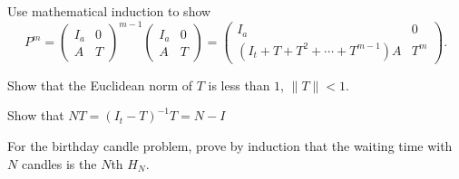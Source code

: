 \documentclass[12pt]{article}
\begin{document}
\begin{exercise}
  Use mathematical induction to show
\[
    P^{m} =
    \begin{pmatrix}
        I_a & 0 \\
        A & T
    \end{pmatrix}
    ^{m-1}
    \begin{pmatrix}
        I_a & 0 \\
        A & T
    \end{pmatrix}
    =
    \begin{pmatrix}
        I_a & 0 \\
        (I_t + T + T^2 + \cdots + T^{m-1})A & T^m
    \end{pmatrix}.
\]
\end{exercise}

\begin{solution}
  
\end{solution}

\begin{exercise}
Show
that the
Euclidean norm of \( T \) is less than \( 1 \), \( \| T \| < 1 \).
\end{exercise}
\begin{solution}
  
\end{solution}
\begin{exercise}
   Show that \( NT =
   (I_t - T)^{-1} T = N - I \)
 \end{exercise}
 \begin{solution}
   
 \end{solution}
\begin{solution}
  
\end{solution}

\begin{exercise}
  For the birthday candle problem, prove by induction that the
  waiting time with \( N \)
    candles is the \( N \)th  \( H_N \).
  \end{exercise}
  \begin{solution}
    
  \end{solution}
\hr
\end{document}
